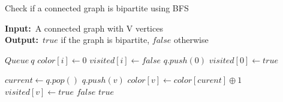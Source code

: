 \documentclass[12pt]{article}
\renewcommand{\algorithmicrequire}{\textbf{Input:}}
\renewcommand{\algorithmicensure}{\textbf{Output:}}
\begin{document}
\begin{algorithm}

  \caption{Check if a connected graph is bipartite using BFS}
  
  \algorithmicrequire \ A connected graph with V vertices\\
  \algorithmicensure \ $true$ if the graph is bipartite, $false$ otherwise
  
  \begin{algorithmic}[1]
    
    \Statex
    
    
        \State $Queue\ q$ 
         
            \State $color[i] \gets 0$
            \State $visited[i] \gets false$
        \EndFor
        \State $q.push(0)$ 
        \State $visited[0] \gets true$
        
        \Statex
            \State $current \gets q.pop()$
             
                    \State $q.push(v)$ 
                    \State $color[v] \gets color[curent] \oplus 1$
                    \State $visited[v] \gets true$
                \Else
                        \State \Return $false$ 
                    \EndIf
                \EndIf
            \EndFor
        \EndWhile
        \State \Return $true$
    \EndFunction
  \end{algorithmic}
  
\end{algorithm}
\end{document}
